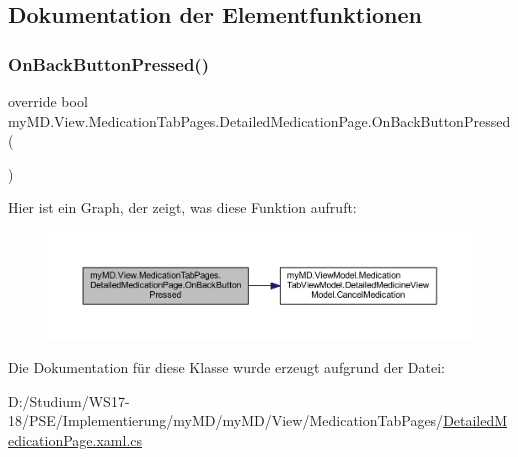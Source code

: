 \subsection{Dokumentation der Elementfunktionen}
\mbox{\label{classmy_m_d_1_1_view_1_1_medication_tab_pages_1_1_detailed_medication_page_ac5b60cfc6f750fe83431e6b3fa850f6b}} 
\subsubsection{\texorpdfstring{On\+Back\+Button\+Pressed()}{OnBackButtonPressed()}}
{\footnotesize\ttfamily override bool my\+M\+D.\+View.\+Medication\+Tab\+Pages.\+Detailed\+Medication\+Page.\+On\+Back\+Button\+Pressed (\begin{DoxyParamCaption}{ }\end{DoxyParamCaption})\hspace{0.3cm}{\ttfamily [protected]}}

Hier ist ein Graph, der zeigt, was diese Funktion aufruft\+:
\nopagebreak
\begin{figure}[H]
\begin{center}
\leavevmode
\includegraphics[width=350pt]{classmy_m_d_1_1_view_1_1_medication_tab_pages_1_1_detailed_medication_page_ac5b60cfc6f750fe83431e6b3fa850f6b_cgraph}
\end{center}
\end{figure}


Die Dokumentation für diese Klasse wurde erzeugt aufgrund der Datei\+:\begin{DoxyCompactItemize}
\item 
D\+:/\+Studium/\+W\+S17-\/18/\+P\+S\+E/\+Implementierung/my\+M\+D/my\+M\+D/\+View/\+Medication\+Tab\+Pages/\mbox{\hyperlink{_detailed_medication_page_8xaml_8cs}{Detailed\+Medication\+Page.\+xaml.\+cs}}\end{DoxyCompactItemize}
